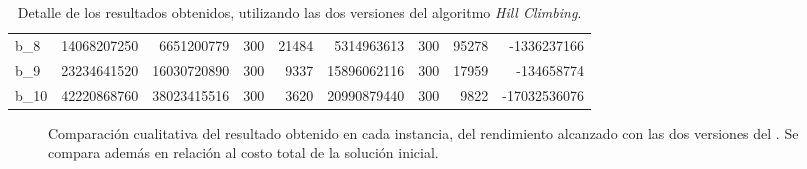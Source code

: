 \documentclass[../informe2.tex]{subfiles}
\begin{document}
\begin{table}[h]
{\begin{tabular}{@{}lrrrrrrrr@{}}
b\_8      & 14068207250                 & 6651200779             & 300                        & 21484                           & 5314963613                & 300                        & 95278                           & -1336237166                    \\
b\_9      & 23234641520                 & 16030720890            & 300                        & 9337                            & 15896062116               & 300                        & 17959                           & -134658774                     \\
b\_10     & 42220868760                 & 38023415516            & 300                        & 3620                            & 20990879440               & 300                        & 9822                            & -17032536076                   \\ \bottomrule
\end{tabular}}
\caption{\small Detalle de los resultados obtenidos, utilizando las dos versiones del algoritmo \textit{Hill Climbing}.}\label{tabla:hc-comparative}
\end{table}


\begin{figure}[h]
	\caption{\small Comparación cualitativa del resultado obtenido en cada instancia, del rendimiento alcanzado con las dos versiones del \hillc. Se compara además en relación al costo total de la solución inicial.}\label{fig:comparativa-hc}
\end{figure}
\end{document}

